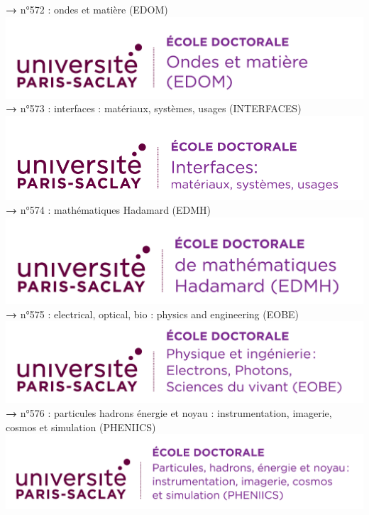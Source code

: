 \documentclass[english,12pt,a4paper]{book}
\begin{document}
\noindent \textbf{\color{Prune}→} n°572 : ondes et matière (EDOM)\\
\includegraphics[scale=.7]{logo_usp_EDOM.png}\\
\newpage
\noindent \textbf{\color{Prune}→} n°573 : interfaces : matériaux, systèmes, usages (INTERFACES)\\
\includegraphics[scale=.535]{logo_usp_INTERFACES.png}\\

\noindent \textbf{\color{Prune}→} n°574 : mathématiques Hadamard (EDMH)\\
\includegraphics[scale=.7]{logo_usp_EDMH.png}\\

\noindent \textbf{\color{Prune}→} n°575 : electrical, optical, bio : physics and engineering  (EOBE)\\
\includegraphics[scale=0.15]{logo_ups_EOBE.png}\\

\noindent \textbf{\color{Prune}→} n°576 : particules hadrons énergie et noyau : instrumentation, imagerie, cosmos et simulation (PHENIICS)\\
\includegraphics[scale=.7]{logo_usp_PHENIICS.png}\\
\end{document}
